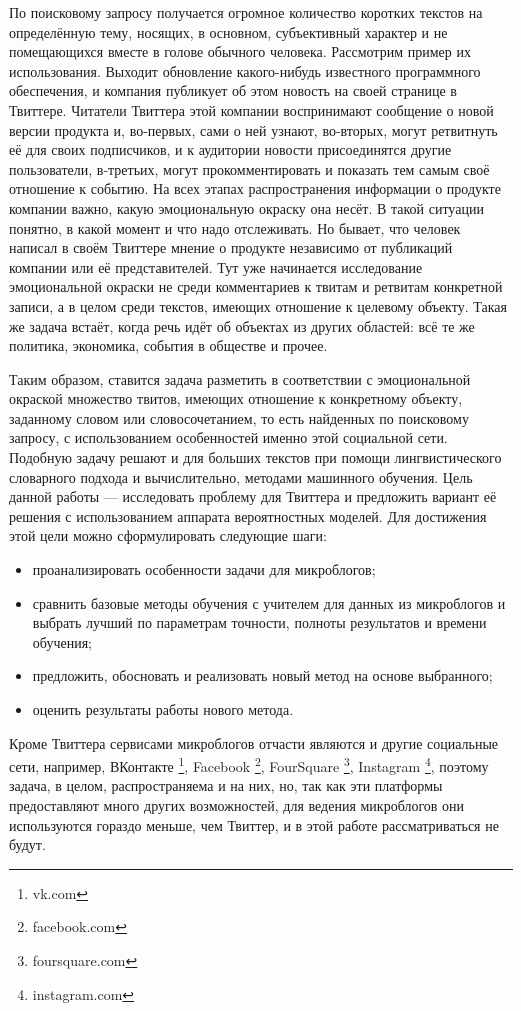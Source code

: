 По поисковому запросу получается огромное количество коротких текстов на определённую
тему, носящих, в основном, субъективный характер и не помещающихся вместе
в голове обычного человека. Рассмотрим пример их использования.
Выходит обновление какого-нибудь известного программного обеспечения, и компания публикует об этом
новость на своей странице в Твиттере. Читатели Твиттера этой компании воспринимают
сообщение о новой версии продукта и, во-первых, сами о ней узнают, во-вторых,
могут ретвитнуть её для своих подписчиков, и к аудитории новости присоединятся другие пользователи,
в-третьих, могут прокомментировать и показать тем самым своё отношение к событию.
На всех этапах распространения информации о продукте компании важно, какую
эмоциональную окраску она несёт. В такой ситуации понятно, в какой момент и что
надо отслеживать. Но бывает, что человек написал в своём Твиттере мнение о
продукте независимо от публикаций компании или её представителей. Тут уже
начинается исследование эмоциональной окраски не среди комментариев к твитам и
ретвитам конкретной записи, а в целом среди текстов, имеющих отношение к целевому
объекту. Такая же задача встаёт, когда речь идёт об объектах из других областей:
всё те же политика, экономика, события в обществе и прочее.

Таким образом, ставится задача разметить в соответствии с эмоциональной окраской
множество твитов, имеющих отношение к конкретному объекту, заданному словом или
словосочетанием, то есть найденных по поисковому запросу, с использованием особенностей именно этой социальной сети. Подобную
задачу решают и для больших текстов при помощи лингвистического словарного подхода и
вычислительно, методами машинного обучения. Цель данной работы ---
исследовать проблему для Твиттера и предложить вариант её решения с использованием
аппарата вероятностных моделей. Для достижения этой цели можно сформулировать следующие шаги:
\begin{itemize}
\item проанализировать особенности задачи для микроблогов;
\item сравнить базовые методы обучения с учителем для данных из микроблогов и выбрать лучший по
  параметрам точности, полноты результатов и времени обучения;
\item предложить, обосновать и реализовать новый метод на основе выбранного;
\item оценить результаты работы нового метода.
\end{itemize}

Кроме Твиттера сервисами микроблогов отчасти являются и другие социальные сети, например,
ВКонтакте \footnote{vk.com}, Facebook \footnote{facebook.com}, FourSquare \footnote{foursquare.com},
Instagram \footnote{instagram.com}, поэтому задача, в целом, распространяема и на них,
но, так как эти платформы предоставляют много других возможностей, для ведения
микроблогов они используются гораздо меньше, чем Твиттер, и в этой работе
рассматриваться не будут.
